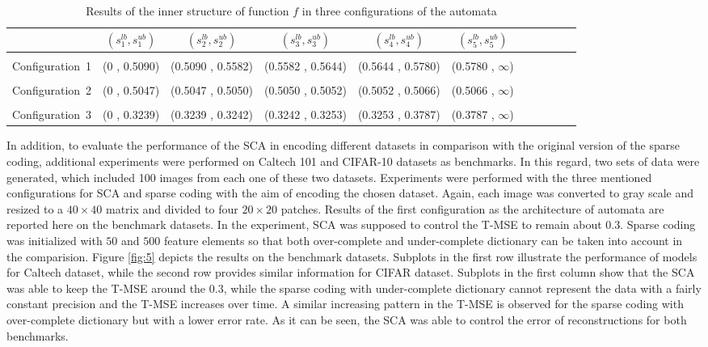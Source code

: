 \documentclass[journal]{IEEEtran}
\begin{document}
\begin{table*}[ht] \label{tbl:1}
\caption{Results of the inner structure of function $f$ in three configurations of the automata}
\vspace{0.2cm} \centering
\begin{tabular}{c c c c c c c c c c c}
\hline \hline  
 & $(s_1^{lb} , s_1^{ub})$ & $(s_2^{lb} , s_2^{ub})$ & $(s_3^{lb} , s_3^{ub})$ & $(s_4^{lb} , s_4^{ub})$ & $(s_5^{lb} , s_5^{ub})$ \\
[0.5ex]
\hline \hline \\
Configuration~1 &	(0 , 0.5090) & (0.5090	, 0.5582) & (0.5582 , 0.5644)	& (0.5644 , 0.5780) & (0.5780 , $\infty$)  \\
[1ex]

 \\
Configuration~2 &	(0 , 0.5047) & (0.5047	, 	0.5050) & (0.5050 , 0.5052)	& (0.5052 , 0.5066) & (0.5066 , $\infty$)  \\
[1ex] 

 \\
Configuration~3 &	(0 , 0.3239) & (0.3239	, 0.3242) & (0.3242 , 0.3253)	& (0.3253 , 0.3787) & (0.3787 , $\infty$)  \\
[1ex] 
	

\hline
\end{tabular}
\end{table*}


In addition, to evaluate the performance of the SCA in encoding different datasets in comparison with the original version of the sparse coding, additional experiments were performed on Caltech 101 and CIFAR-10 datasets as benchmarks. In this regard, two sets of data were generated, which included 100 images from each one of these two datasets. Experiments were performed with the three mentioned configurations for SCA and sparse coding with the aim of encoding the chosen dataset. Again, each image was converted to gray scale and resized to a $40 \times 40$ matrix and divided to four $20 \times 20$ patches. Results of the first configuration as the architecture of automata are reported here on the benchmark datasets. In the experiment, SCA was supposed to control the T-MSE to remain about $0.3$. Sparse coding was initialized with $50$ and $500$ feature elements so that both over-complete and under-complete dictionary can be taken into account in the comparision. Figure \ref{fig:5} depicts the results on the benchmark datasets. Subplots in the first row illustrate the performance of models for Caltech dataset, while the second row provides similar information for CIFAR dataset. Subplots in the first column show that the SCA was able to keep the T-MSE around the $0.3$, while the sparse coding with under-complete dictionary cannot represent the data with a fairly constant precision and the T-MSE increases over time. A similar increasing pattern in the T-MSE is observed for the sparse coding with over-complete dictionary but with a lower error rate. As it can be seen, the SCA was able to control the error of reconstructions for both benchmarks.  
\end{document}
